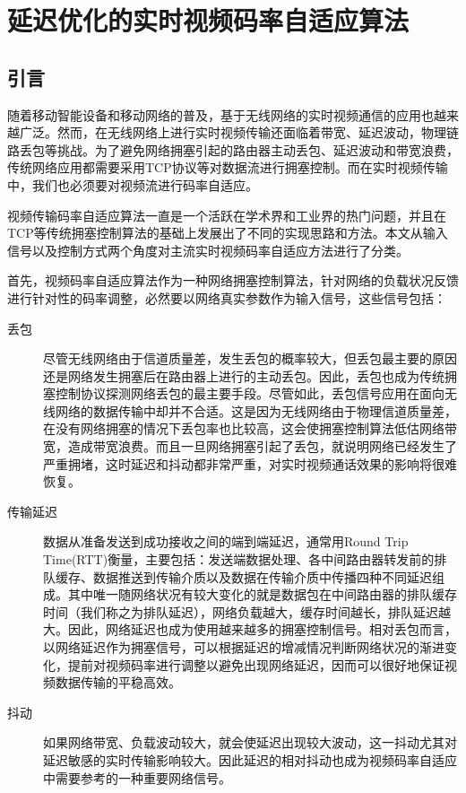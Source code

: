 \chapter{延迟优化的实时视频码率自适应算法}
\label{chap:rate}

\section{引言}
随着移动智能设备和移动网络的普及，基于无线网络的实时视频通信的应用也越来越广泛。然而，在无线网络上进行实时视频传输还面临着带宽、延迟波动，物理链路丢包等挑战。为了避免网络拥塞引起的路由器主动丢包、延迟波动和带宽浪费，传统网络应用都需要采用TCP协议等对数据流进行拥塞控制。而在实时视频传输中，我们也必须要对视频流进行码率自适应。

视频传输码率自适应算法一直是一个活跃在学术界和工业界的热门问题，并且在TCP等传统拥塞控制算法的基础上发展出了不同的实现思路和方法。本文从输入信号以及控制方式两个角度对主流实时视频码率自适应方法进行了分类。

首先，视频码率自适应算法作为一种网络拥塞控制算法，针对网络的负载状况反馈进行针对性的码率调整，必然要以网络真实参数作为输入信号，这些信号包括：
\begin{description}
    \item[丢包] 尽管无线网络由于信道质量差，发生丢包的概率较大，但丢包最主要的原因还是网络发生拥塞后在路由器上进行的主动丢包。因此，丢包也成为传统拥塞控制协议探测网络丢包的最主要手段。尽管如此，丢包信号应用在面向无线网络的数据传输中却并不合适。这是因为无线网络由于物理信道质量差，在没有网络拥塞的情况下丢包率也比较高，这会使拥塞控制算法低估网络带宽，造成带宽浪费。而且一旦网络拥塞引起了丢包，就说明网络已经发生了严重拥堵，这时延迟和抖动都非常严重，对实时视频通话效果的影响将很难恢复。
    \item[传输延迟] 数据从准备发送到成功接收之间的端到端延迟，通常用Round Trip Time(RTT)衡量，主要包括：发送端数据处理、各中间路由器转发前的排队缓存、数据推送到传输介质以及数据在传输介质中传播四种不同延迟组成。其中唯一随网络状况有较大变化的就是数据包在中间路由器的排队缓存时间（我们称之为排队延迟），网络负载越大，缓存时间越长，排队延迟越大。因此，网络延迟也成为使用越来越多的拥塞控制信号。相对丢包而言，以网络延迟作为拥塞信号，可以根据延迟的增减情况判断网络状况的渐进变化，提前对视频码率进行调整以避免出现网络延迟，因而可以很好地保证视频数据传输的平稳高效。
    \item[抖动] 如果网络带宽、负载波动较大，就会使延迟出现较大波动，这一抖动尤其对延迟敏感的实时传输影响较大。因此延迟的相对抖动也成为视频码率自适应中需要参考的一种重要网络信号。
\end{description}

